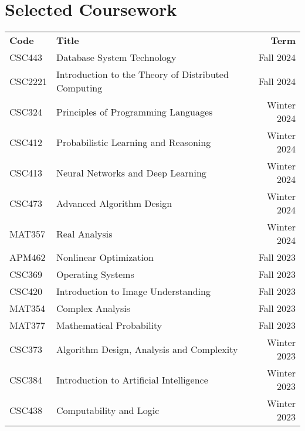 \documentclass[letterpaper,11pt]{article}
\newcommand{\rom}[1]{\uppercase\expandafter{\romannumeral #1\relax}}
\begin{document}
    \section{Selected Coursework}
    \vspace{-0.3em}
    \begin{minipage}{\textwidth}
      \centering
      \renewcommand*{\thefootnote}{\fnsymbol{footnote}}
      \renewcommand*{\thempfootnote}{\fnsymbol{mpfootnote}}
      \renewcommand{\arraystretch}{1.2}
      \begin{tabularx}{0.98\textwidth}{ p{6.0em} X r }
        \textbf{Code} & \textbf{Title} & \textbf{Term} \\
        \noalign{\vspace{0.1em}}
        \hline\hline
        \noalign{\vspace{0.2em}}
        CSC443 & Database System Technology & Fall 2024 \\
        CSC2221\footnotemark[1] & Introduction to the Theory of Distributed Computing & Fall 2024 \\

        CSC324 & Principles of Programming Languages & Winter 2024 \\
        CSC412\footnotemark[2] & Probabilistic Learning and Reasoning & Winter 2024 \\
        CSC413\footnotemark[2] & Neural Networks and Deep Learning & Winter 2024 \\
        CSC473 & Advanced Algorithm Design & Winter 2024 \\
        MAT357 & Real Analysis \rom{1} & Winter 2024 \\


        APM462 & Nonlinear Optimization & Fall 2023 \\
        CSC369 & Operating Systems & Fall 2023 \\
        CSC420 & Introduction to Image Understanding & Fall 2023 \\
        MAT354 & Complex Analysis \rom{1} & Fall 2023 \\
        MAT377 & Mathematical Probability & Fall 2023 \\


        CSC373 & Algorithm Design, Analysis and Complexity & Winter 2023 \\
        CSC384 & Introduction to Artificial Intelligence & Winter 2023 \\
        CSC438 & Computability and Logic & Winter 2023 \\


\end{tabularx}
\end{minipage}
\end{document}
